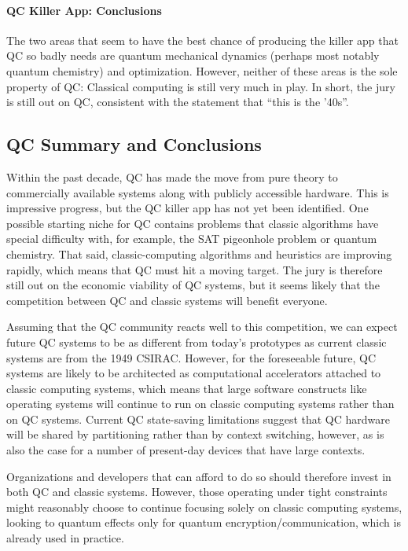 \paragraph{QC Killer App: Conclusions}
\label{sec:future:QC Killer App: Conclusions}

The two areas that seem to have the best chance of producing the killer
app that QC so badly needs are quantum mechanical dynamics (perhaps
most notably quantum chemistry) and optimization.
However, neither of these areas is the sole property of QC: Classical
computing is still very much in play.
In short, the jury is still out on QC, consistent with the
statement that ``this is the '40s''.

\subsection{QC Summary and Conclusions}
\label{sec:future:QC Summary and Conclusions}

Within the past decade, QC has made the move from pure theory to
commercially available systems along with publicly accessible hardware.
This is impressive progress, but the QC killer app has not yet been
identified.
One possible starting niche for QC contains problems that classic algorithms
have special difficulty with, for example, the SAT pigeonhole problem
or quantum chemistry.
That said, classic-computing algorithms and heuristics are improving
rapidly, which means that QC must hit a moving target.
The jury is therefore still out on the economic viability of QC systems,
but it seems likely that the competition between
QC and classic systems will benefit everyone.

Assuming that the QC community reacts well to this competition,
we can expect future QC systems to be as different from
today's prototypes as current classic systems are from the 1949 CSIRAC.
However, for the foreseeable future, QC systems are likely to be
architected as computational accelerators attached to classic computing
systems,
which means that large software constructs like operating systems will
continue to run on classic computing systems rather than on QC systems.
Current QC state-saving limitations suggest that QC hardware will be shared by
partitioning rather than by context switching, however, as is also
the case for a number of present-day devices that have large contexts.

Organizations and developers that can afford to do so should therefore
invest in both QC and classic systems.
However, those operating under tight constraints might reasonably choose
to continue focusing solely on classic computing systems, looking to
quantum effects only for quantum encryption/communication, which is
already used in practice.
